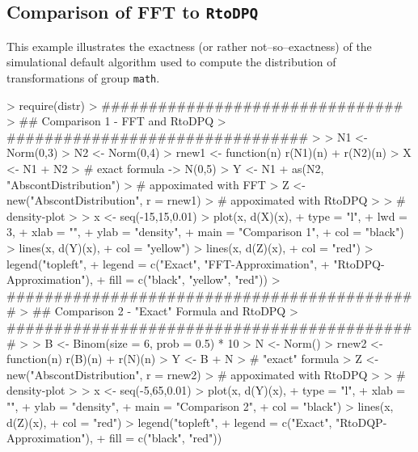 \documentclass[11pt]{article}
\begin{document}
\subsection{Comparison of FFT to {\tt RtoDPQ}}\label{compex}
\begin{small}
  This example illustrates the exactness (or rather not--so--exactness) of the
  simulational default algorithm used to compute the distribution of
  transformations of group {\tt math}.
\end{small}
\begin{Schunk}
\begin{Sinput}
> require(distr)
> ################################
> ## Comparison 1 - FFT and RtoDPQ
> ################################
>
> N1 <- Norm(0,3)
> N2 <- Norm(0,4)
> rnew1 <- function(n) r(N1)(n) + r(N2)(n)
> X <- N1 + N2
>      # exact formula -> N(0,5)
> Y <- N1 + as(N2, "AbscontDistribution")
>      # appoximated with FFT
> Z <- new("AbscontDistribution", r = rnew1)
>      # appoximated with RtoDPQ
>
> # density-plot
>
> x <- seq(-15,15,0.01)
> plot(x, d(X)(x),
+      type = "l",
+      lwd = 3,
+      xlab = "",
+      ylab = "density",
+      main = "Comparison 1",
+      col = "black")
> lines(x, d(Y)(x),
+      col = "yellow")
> lines(x, d(Z)(x),
+      col = "red")
> legend("topleft",
+   legend = c("Exact", "FFT-Approximation",
+              "RtoDPQ-Approximation"),
+        fill = c("black", "yellow", "red"))
> ############################################
> ## Comparison 2 - "Exact" Formula and RtoDPQ
> ############################################
>
> B <- Binom(size = 6, prob = 0.5) * 10
> N <- Norm()
> rnew2 <- function(n) r(B)(n) + r(N)(n)
> Y <- B + N
>      # "exact" formula
> Z <- new("AbscontDistribution", r = rnew2)
>      # appoximated with RtoDPQ
>
> # density-plot
>
> x  <- seq(-5,65,0.01)
> plot(x, d(Y)(x),
+      type = "l",
+      xlab = "",
+      ylab = "density",
+      main = "Comparison 2",
+      col = "black")
> lines(x, d(Z)(x),
+      col = "red")
> legend("topleft",
+        legend = c("Exact", "RtoDQP-Approximation"),
+        fill = c("black", "red"))
\end{Sinput}
\end{Schunk}
\end{document}
